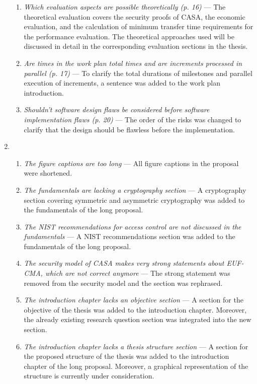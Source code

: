 \begin{enumerate}[label=R\arabic*.]
\begin{enumerate}[label=Q\arabic*.]
        \item \textit{Which evaluation aspects are possible theoretically (p. 16)} --- The theoretical evaluation covers the security proofs of CASA, the economic evaluation, and the calculation of minimum transfer time requirements for the performance evaluation. The theoretical approaches used will be discussed in detail in the corresponding evaluation sections in the thesis.
        \item \textit{Are times in the work plan total times and are increments processed in parallel (p. 17)} --- To clarify the total durations of milestones and parallel execution of increments, a sentence was added to the work plan introduction.
        \item \textit{Shouldn't software design flaws be considered before software implementation flaws (p. 20)} --- The order of the risks was changed to clarify that the design should be flawless before the implementation.
    \end{enumerate}
    \item \begin{enumerate}[label=Q\arabic*.]
        \item \textit{The figure captions are too long} --- All figure captions in the proposal were shortened.
        \item \textit{The fundamentals are lacking a cryptography section} --- A cryptography section covering symmetric and asymmetric cryptography was added to the fundamentals of the long proposal.
        \item \textit{The NIST recommendations for access control are not discussed in the fundamentals} --- A NIST recommendations section was added to the fundamentals of the long proposal.
        \item \textit{The security model of CASA makes very strong statements about EUF-CMA, which are not correct anymore} --- The strong statement was removed from the security model and the section was rephrased.
        \item \textit{The introduction chapter lacks an objective section} --- A section for the objective of the thesis was added to the introduction chapter. Moreover, the already existing research question section was integrated into the new section.
        \item \textit{The introduction chapter lacks a thesis structure section} --- A section for the proposed structure of the thesis was added to the introduction chapter of the long proposal. Moreover, a graphical representation of the structure is currently under consideration.

\end{enumerate}
\end{enumerate}

